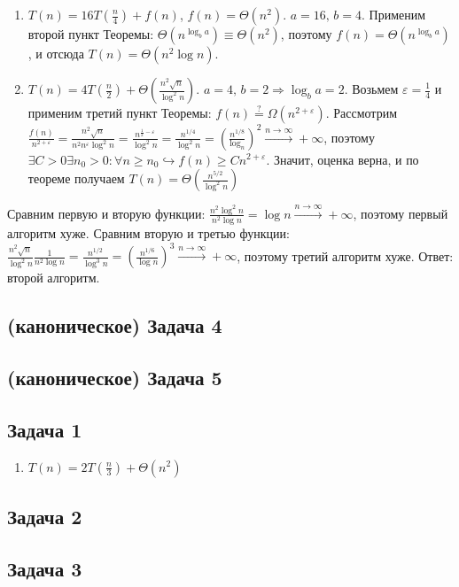 \documentclass[a4paper]{article}
\def\eps{\varepsilon}
\begin{document}
\begin{enumerate}
\begin{enumerate}
\end{enumerate}
\item $T(n)=16T(\frac{n}{4})+f(n)$, $f(n)=\Theta(n^2)$. $a=16,\,b=4$. Применим второй пункт Теоремы: $\Theta(n^{\log_b a})\equiv\Theta(n^2)$, поэтому $f(n)=\Theta(n^{\log_b a})$, и отсюда $T(n)=\boxed{\Theta(n^2\log n)}$.
\item $T(n)=4T(\frac{n}{2})+\Theta(\frac{n^2\sqrt{n}}{\log^2n})$. $a=4,\,b=2\Rightarrow\log_b a=2$. Возьмем $\eps=\frac{1}{4}$ и применим третий пункт Теоремы: $f(n)\overset{?}{=}\Omega(n^{2+\eps})$. Рассмотрим $\frac{f(n)}{n^{2+\eps}}=\frac{n^2\sqrt{n}}{n^2n^\eps\log^2 n}=\frac{n^{\frac{1}{2}-\eps}}{\log^2 n}=\frac{n^{1/4}}{\log^2 n}=(\frac{n^{1/8}}{\log_n})^2\overset{n\to\infty}{\longrightarrow}+\infty$, поэтому $\exists C>0\exists n_0>0\colon \forall n\geqslant n_0\hookrightarrow f(n)\geqslant C n^{2+\eps}$. Значит, оценка верна, и по теореме получаем $T(n)=\boxed{\Theta(\frac{n^{5/2}}{\log^2n})}$
\end{enumerate}
Сравним первую и вторую функции: $\frac{n^2\log^2 n}{n^2\log n}=\log n\overset{n\to\infty}{\longrightarrow}+\infty$, поэтому первый алгоритм хуже. Сравним вторую и третью функции: $\frac{n^2\sqrt{n}}{\log^2n}\frac{1}{n^2\log n}=\frac{n^{1/2}}{\log^3 n}=(\frac{n^{1/6}}{\log n})^3\overset{n\to\infty}{\longrightarrow}+\infty$, поэтому третий алгоритм хуже.
Ответ: $\boxed{\mbox{второй алгоритм}}$.
\subsection*{(каноническое) Задача 4}
\subsection*{(каноническое) Задача 5}
\subsection*{Задача 1}
\begin{enumerate}
\item $T(n)=2T(\frac{n}{3})+\Theta(n^2)$
\end{enumerate}
\subsection*{Задача 2}
\subsection*{Задача 3}
\end{document}
